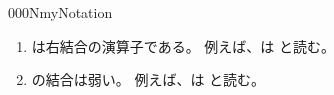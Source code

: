 \documentclass[index]{subfiles}
\begin{document}
\begin{myBlock}{000N}{myNotation}
  \begin{enumerate}
  \item \myInlineMath{\myPairType}は右結合の演算子である。
    例えば、は
    と読む。
  \item {}の結合は弱い。
    例えば、は
    と読む。
  \end{enumerate}
\end{myBlock}
\end{document}
